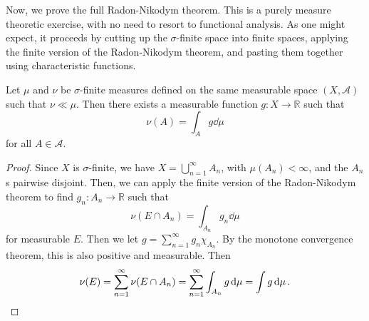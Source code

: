 \documentclass[twoside,symmetric, openany, 12pt]{./tuftebook}
\theoremstyle{definition}
\theoremstyle{definition}
\theoremstyle{definition}
\newcommand{\R}{\mathbb{R}}
\begin{document}
Now, we prove the full Radon-Nikodym theorem. This is a purely measure theoretic exercise, with no need to resort to functional analysis. As one might expect, it proceeds by cutting up the $\sigma$-finite space into finite spaces, applying the finite version of the Radon-Nikodym theorem, and pasting them together using characteristic functions.
\begin{Theorem}
	Let $\mu$ and $\nu$ be $\sigma$-finite measures defined on the same measurable space $(X, \mathcal{A})$ such that $\nu\ll \mu$. Then there exists a measurable function $g:X\to \R$ such that
	\[\nu(A) = \int_A g\dd{\mu}\]
	for all $A\in \mathcal{A}$.
\end{Theorem}
\begin{proof}
	Since $X$ is $\sigma$-finite, we have $X=\bigcup_{n=1}^\infty A_n$, with $\mu(A_n)<\infty$, and the $A_n$s pairwise disjoint. Then, we can apply the finite version of the Radon-Nikodym theorem to find $g_n: A_n\to \R$ such that 
	\[\nu(E \cap A_n) = \int_{A_n} g_n\dd{\mu}\]
	for measurable $E$. Then we let $g=\sum_{n=1}^\infty g_n \chi_{A_n}$. By the monotone convergence theorem, this is also positive and measurable. Then
	\[\nu(E) = \sum_{n=1}^\infty \nu(E \cap A_n) = \sum_{n=1}^\infty \int_{A_n} g\dd{\mu} = \int g\dd{\mu}.\qedhere\]
\end{proof}
\renewcommand{\listtheoremname}{List of Definitions}
\listoftheorems[ignoreall, onlynamed={Definition}]
\renewcommand{\listtheoremname}{List of Theorems}
\listoftheorems[ignoreall, onlynamed={Theorem}]
\end{document}
